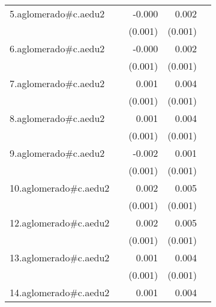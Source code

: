 {\begin{longtable}{l*{4}{D{.}{.}{-1}}}
\addlinespace
5.aglomerado#c.aedu2&                     &      -0.000         &       0.002\sym{**} &                     \\
            &                     &     (0.001)         &     (0.001)         &                     \\
\addlinespace
6.aglomerado#c.aedu2&                     &      -0.000         &       0.002\sym{**} &                     \\
            &                     &     (0.001)         &     (0.001)         &                     \\
\addlinespace
7.aglomerado#c.aedu2&                     &       0.001         &       0.004\sym{***}&                     \\
            &                     &     (0.001)         &     (0.001)         &                     \\
\addlinespace
8.aglomerado#c.aedu2&                     &       0.001         &       0.004\sym{***}&                     \\
            &                     &     (0.001)         &     (0.001)         &                     \\
\addlinespace
9.aglomerado#c.aedu2&                     &      -0.002         &       0.001         &                     \\
            &                     &     (0.001)         &     (0.001)         &                     \\
\addlinespace
10.aglomerado#c.aedu2&                     &       0.002         &       0.005\sym{***}&                     \\
            &                     &     (0.001)         &     (0.001)         &                     \\
\addlinespace
12.aglomerado#c.aedu2&                     &       0.002         &       0.005\sym{***}&                     \\
            &                     &     (0.001)         &     (0.001)         &                     \\
\addlinespace
13.aglomerado#c.aedu2&                     &       0.001         &       0.004\sym{***}&                     \\
            &                     &     (0.001)         &     (0.001)         &                     \\
\addlinespace
14.aglomerado#c.aedu2&                     &       0.001         &       0.004\sym{***}&                     \\

\end{longtable}}
